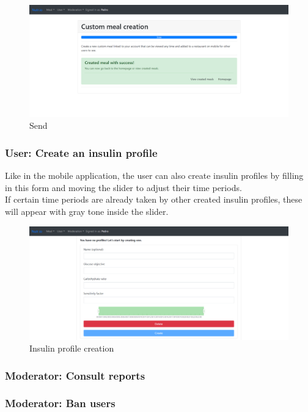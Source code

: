 \begin{figure}[H]
    \begin{center}
        \includegraphics[scale=0.4]{_figures/custom-5.png}
        \caption{Send}
    \end{center}
\end{figure}

\subsubsection{User: Create an insulin profile}

Like in the mobile application, the user can also create insulin profiles by filling in this form 
and moving the slider to adjust their time periods.\\

If certain time periods are already taken by other created insulin profiles, these will appear with
gray tone inside the slider.\\

\begin{figure}[H]
    \begin{center}
        \includegraphics[scale=0.4]{_figures/web-insulin-profile-creation.png}
        \caption{Insulin profile creation}
    \end{center}
\end{figure}

\subsubsection{Moderator: Consult reports}

\subsubsection{Moderator: Ban users}
